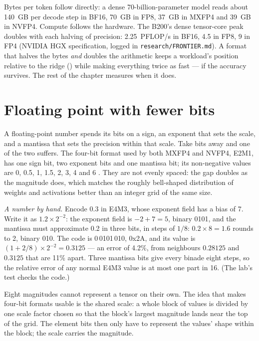 Bytes per token follow directly: a dense 70-billion-parameter model reads about
140~GB per decode step in BF16, 70~GB in FP8, 37~GB in MXFP4 and 39~GB in NVFP4.
Compute follows the hardware. The B200's dense tensor-core peak doubles with
each halving of precision: 2.25~PFLOP/s in BF16, 4.5 in FP8, 9 in FP4 (NVIDIA
HGX specification, logged in \texttt{research/FRONTIER.md}). A format that
halves the bytes \emph{and} doubles the arithmetic keeps a workload's position
relative to the ridge () while making everything twice as
fast --- if the accuracy survives. The rest of the chapter measures when it
does.

\section{Floating point with fewer bits}

A floating-point number spends its bits on a sign, an exponent that sets the
scale, and a mantissa that sets the precision within that scale. Take bits
away and one of the two suffers. The four-bit format used by both MXFP4 and
NVFP4, E2M1, has one sign bit, two exponent bits and one mantissa bit; its
non-negative values are 0, 0.5, 1, 1.5, 2, 3, 4 and 6
\cite{nvidia2025nvfp4}. They are not evenly spaced: the gap doubles as the
magnitude does, which matches the roughly bell-shaped distribution of weights
and activations better than an integer grid of the same size.


\emph{A number by hand.} Encode 0.3 in E4M3, whose exponent field has a bias of
7. Write it as $1.2 \times 2^{-2}$: the exponent field is $-2 + 7 = 5$, binary
0101, and the mantissa must approximate 0.2 in three bits, in steps of $1/8$:
$0.2 \times 8 = 1.6$ rounds to 2, binary 010. The code is 0\,0101\,010, 0x2A,
and its value is $(1 + 2/8) \times 2^{-2} = 0.3125$ --- an error of 4.2\%, from
neighbours $0.28125$ and $0.3125$ that are 11\% apart. Three mantissa bits give
every binade eight steps, so the relative error of any normal E4M3 value is at
most one part in 16. (The lab's test checks the code.)

Eight magnitudes cannot represent a tensor on their own. The idea that makes
four-bit formats usable is the shared scale: a whole block of values is
divided by one scale factor chosen so that the block's largest magnitude lands
near the top of the grid. The element bits then only have to represent the
values' shape within the block; the scale carries the magnitude.

